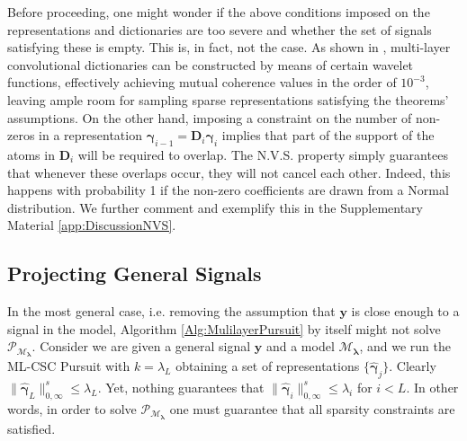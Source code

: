 \documentclass[10pt,journal]{IEEEtran}
\def\y{{\mathbf y}}
\def\D{{\mathbf D}}
\def\M{{\mathcal{M}}}
\def\P{{\mathcal{P}}}
\def\gama{{\boldsymbol \gamma}}
\def\lamda{{\boldsymbol \lambda}}
\def\PM{{\P_{\M_\lamda}}}
\theoremstyle{plain}
\theoremstyle{definition}
\begin{document}
Before proceeding, one might wonder if the above conditions imposed on the representations and dictionaries are too severe and whether the set of signals satisfying these is empty. This is, in fact, not the case. As shown in \cite{Papyan2016convolutional}, multi-layer convolutional dictionaries can be constructed by means of certain wavelet functions, effectively achieving mutual coherence values in the order of $10^{-3}$, leaving ample room for sampling sparse representations satisfying the theorems' assumptions. On the other hand, imposing a constraint on the number of non-zeros in a representation $\gama_{i-1} = \D_i \gama_i$ implies that part of the support of the atoms in $\D_i$ will be required to overlap. The N.V.S. property simply guarantees that whenever these overlaps occur, they will not cancel each other. Indeed, this happens with probability 1 if the non-zero coefficients are drawn from a Normal distribution. We further comment and exemplify this in the Supplementary Material \ref{app:DiscussionNVS}.


\subsection{Projecting General Signals}

In the most general case, i.e. removing the assumption that $\y$ is close enough to a signal in the model, Algorithm \ref{Alg:MulilayerPursuit} by itself might not solve $\PM$. Consider we are given a general signal $\y$ and a model $\M_\lamda$, and we run the ML-CSC Pursuit with $k = \lambda_L$ obtaining a set of representations $\{\hat{\gama}_{j}\}$. Clearly $\|\hat{\gama}_L\|^s_{0,\infty} \leq \lambda_L$. Yet, nothing guarantees that $\| \hat{\gama}_{i}\|^s_{0,\infty} \leq \lambda_i$ for $i<L$. In other words, in order to solve $\PM$ one must guarantee that all sparsity constraints are satisfied. 
\end{document}
